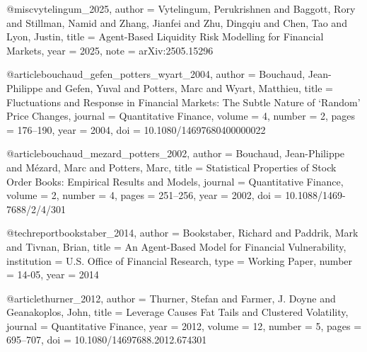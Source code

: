 @misc{vytelingum_2025,
  author = {Vytelingum, Perukrishnen and Baggott, Rory and Stillman, Namid and Zhang, Jianfei and Zhu, Dingqiu and Chen, Tao and Lyon, Justin},
  title  = {Agent-Based Liquidity Risk Modelling for Financial Markets},
  year   = {2025}, note = {arXiv:2505.15296}
}


@article{bouchaud_gefen_potters_wyart_2004,
  author  = {Bouchaud, Jean-Philippe and Gefen, Yuval and Potters, Marc and Wyart, Matthieu},
  title   = {Fluctuations and Response in Financial Markets: The Subtle Nature of `Random' Price Changes},
  journal = {Quantitative Finance},
  volume  = {4}, number = {2}, pages = {176--190}, year = {2004},
  doi     = {10.1080/14697680400000022}
}


@article{bouchaud_mezard_potters_2002,
  author  = {Bouchaud, Jean-Philippe and M{\'e}zard, Marc and Potters, Marc},
  title   = {Statistical Properties of Stock Order Books: Empirical Results and Models},
  journal = {Quantitative Finance},
  volume  = {2}, number = {4}, pages = {251--256}, year = {2002},
  doi     = {10.1088/1469-7688/2/4/301}
}


@techreport{bookstaber_2014,
  author      = {Bookstaber, Richard and Paddrik, Mark and Tivnan, Brian},
  title       = {An Agent-Based Model for Financial Vulnerability},
  institution = {U.S. Office of Financial Research}, type = {Working Paper}, number = {14-05}, year = {2014}
}


@article{thurner_2012,
  author  = {Thurner, Stefan and Farmer, J. Doyne and Geanakoplos, John},
  title   = {Leverage Causes Fat Tails and Clustered Volatility},
  journal = {Quantitative Finance},
  year    = {2012}, volume = {12}, number = {5}, pages = {695--707},
  doi     = {10.1080/14697688.2012.674301}
}


